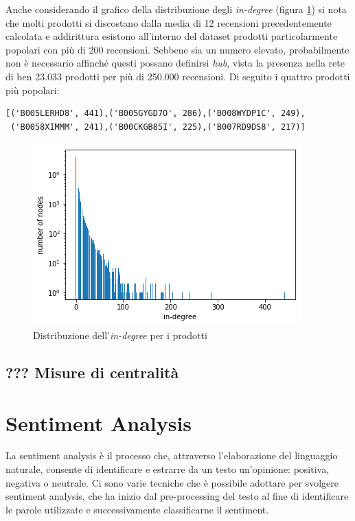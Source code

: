 \documentclass[hidelinks, 12pt]{article}
\begin{document}
Anche considerando il grafico della distribuzione degli \textit{in-degree} (figura \ref{fig:in-degree}) si nota che molti prodotti si discostano dalla media di 12 recensioni precedentemente calcolata e addirittura esistono all'interno del dataset prodotti particolarmente popolari con più di 200 recensioni. Sebbene sia un numero elevato, probabilmente non è necessario affinché questi possano definirsi \textit{hub}, vista la presenza nella rete di ben 23.033 prodotti per più di 250.000 recensioni. Di seguito i quattro prodotti più popolari:

\begin{verbatim}
[('B005LERHD8', 441),('B005GYGD7O', 286),('B008WYDP1C', 249),
 ('B0058XIMMM', 241),('B00CKGB85I', 225),('B007RD9DS8', 217)]
\end{verbatim}

\begin{figure}[H]
\centering
\includegraphics[scale=0.7]{images/03_04_in_degree.png}
\caption[Distribuzione dell'\textit{in-degree} per i prodotti]{Distribuzione dell'\textit{in-degree} per i prodotti}
\label{fig:in-degree}
\end{figure}

\subsection{??? Misure di centralità}



\clearpage



\section{Sentiment Analysis}


La sentiment analysis è il processo che, attraverso l'elaborazione del linguaggio naturale, consente di identificare e estrarre da un testo un'opinione: positiva, negativa o neutrale. Ci sono varie tecniche che è possibile adottare per svolgere sentiment analysis, che ha inizio dal pre-processing del testo al fine di identificare le parole utilizzate e successivamente classificarne il sentiment.
\end{document}
